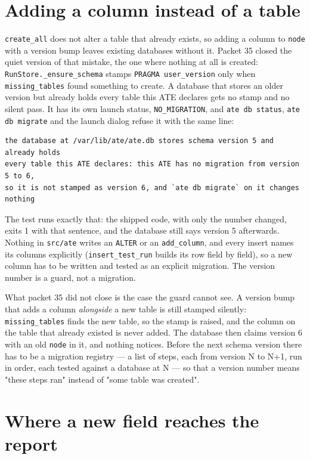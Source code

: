 \section{Adding a column instead of a table}

\texttt{create\_\allowbreak{}all} does not alter a table that already exists, so adding a column to
\texttt{node} with a version bump leaves existing databases without it. Packet 35 closed the quiet
version of that mistake, the one where nothing at all is created: \texttt{RunStore.\_ensure\_\allowbreak{}schema}
stamps \texttt{PRAGMA user\_\allowbreak{}version} only when \texttt{missing\_\allowbreak{}tables} found something to
create. A database that stores an older version but already holds every table this ATE declares gets
no stamp and no silent pass. It has its own launch status, \texttt{NO\_\allowbreak{}MIGRATION}, and
\texttt{ate db status}, \texttt{ate db migrate} and the launch dialog refuse it with the same line:

\begin{verbatim}
the database at /var/lib/ate/ate.db stores schema version 5 and already holds
every table this ATE declares: this ATE has no migration from version 5 to 6,
so it is not stamped as version 6, and `ate db migrate` on it changes nothing
\end{verbatim}

The test runs exactly that: the shipped code, with only the number changed, exits 1 with that
sentence, and the database still says version 5 afterwards. Nothing in
\texttt{src/ate} writes an \texttt{ALTER} or an \texttt{add\_column}, and every insert names its columns
explicitly (\texttt{insert\_test\_run} builds its row field by field), so a new column has to be written
and tested as an explicit migration. The version number is a guard, not a migration.

What packet 35 did not close is the case the guard cannot see. A version bump that adds a column
\emph{alongside} a new table is still stamped silently: \texttt{missing\_tables} finds the new table, so
the stamp is raised, and the column on the table that already existed is never added. The database
then claims version 6 with an old \texttt{node} in it, and nothing notices. Before the next schema
version there has to be a migration registry --- a list of steps, each from version N to N+1, run in
order, each tested against a database at N --- so that a version number means "these steps ran"
instead of "some table was created".

\section{Where a new field reaches the report}

